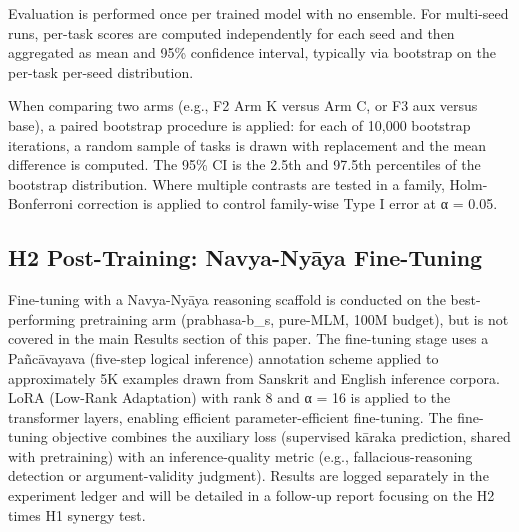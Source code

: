 Evaluation is performed once per trained model with no ensemble. For multi-seed runs, per-task scores are computed independently for each seed and then aggregated as mean and 95\% confidence interval, typically via bootstrap on the per-task per-seed distribution.

When comparing two arms (e.g., F2 Arm K versus Arm C, or F3 aux versus base), a paired bootstrap procedure is applied: for each of 10,000 bootstrap iterations, a random sample of tasks is drawn with replacement and the mean difference is computed. The 95\% CI is the 2.5th and 97.5th percentiles of the bootstrap distribution. Where multiple contrasts are tested in a family, Holm-Bonferroni correction is applied to control family-wise Type I error at α = 0.05.

\subsection{H2 Post-Training: Navya-Nyāya Fine-Tuning}

Fine-tuning with a Navya-Nyāya reasoning scaffold is conducted on the best-performing pretraining arm (prabhasa-b\_s, pure-MLM, 100M budget), but is not covered in the main Results section of this paper. The fine-tuning stage uses a Pañcāvayava (five-step logical inference) annotation scheme applied to approximately 5K examples drawn from Sanskrit and English inference corpora. LoRA (Low-Rank Adaptation) with rank 8 and α = 16 is applied to the transformer layers, enabling efficient parameter-efficient fine-tuning. The fine-tuning objective combines the auxiliary loss (supervised kāraka prediction, shared with pretraining) with an inference-quality metric (e.g., fallacious-reasoning detection or argument-validity judgment). Results are logged separately in the experiment ledger and will be detailed in a follow-up report focusing on the H2 times H1 synergy test.

